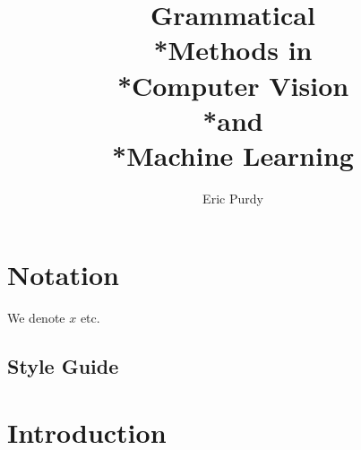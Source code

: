 \documentclass{tufte-book}
\title{ Grammatical\\*Methods in\\*Computer Vision\\*and\\*Machine Learning}
\author[Eric Purdy]{Eric Purdy}
\newcommand{\openepigraph}[2]{%
  \begin{fullwidth}
  \sffamily\large
  \begin{doublespace}
  \noindent\allcaps{#1}\\%
  \noindent\allcaps{#2}%
  \end{doublespace}
  \end{fullwidth}
}
\begin{document}
\frontmatter





\maketitle

\setcounter{tocdepth}{2}
\tableofcontents

\listoffigures

\listoftables


\chapter{Notation}

  We denote $x$ etc.

  \section{Style Guide}
  

\cleardoublepage
\mainmatter

\chapter{Introduction}

  
\end{document}
